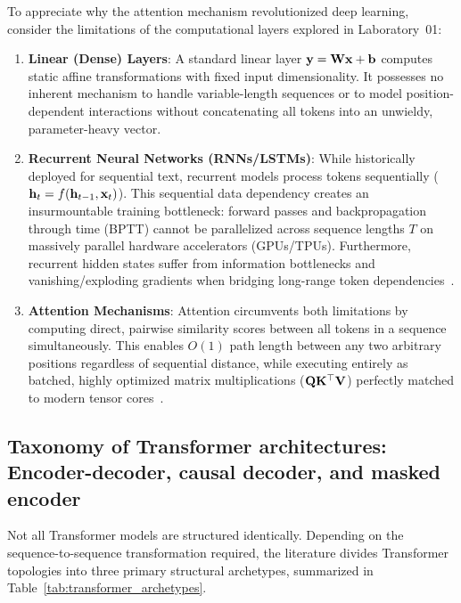 \documentclass[../labs.tex]{subfiles}
\begin{document}
To appreciate why the attention mechanism revolutionized deep learning, consider the limitations of the computational layers explored in Laboratory~01:
\begin{enumerate}
    \item \textbf{Linear (Dense) Layers}: A standard linear layer $\mathbf{y} = \mathbf{W} \mathbf{x} + \mathbf{b}$ computes static affine transformations with fixed input dimensionality. It possesses no inherent mechanism to handle variable-length sequences or to model position-dependent interactions without concatenating all tokens into an unwieldy, parameter-heavy vector.
    \item \textbf{Recurrent Neural Networks (RNNs/LSTMs)}: While historically deployed for sequential text, recurrent models process tokens sequentially ($\mathbf{h}_t = f(\mathbf{h}_{t-1}, \mathbf{x}_t)$). This sequential data dependency creates an insurmountable training bottleneck: forward passes and backpropagation through time (BPTT) cannot be parallelized across sequence lengths $T$ on massively parallel hardware accelerators (GPUs/TPUs). Furthermore, recurrent hidden states suffer from information bottlenecks and vanishing/exploding gradients when bridging long-range token dependencies~\cite{hochreiter1997,pascanu2013difficulty}.
    \item \textbf{Attention Mechanisms}: Attention circumvents both limitations by computing direct, pairwise similarity scores between all tokens in a sequence simultaneously. This enables $O(1)$ path length between any two arbitrary positions regardless of sequential distance, while executing entirely as batched, highly optimized matrix multiplications ($\mathbf{Q} \mathbf{K}^\top \mathbf{V}$) perfectly matched to modern tensor cores~\cite{vaswani2017,dao2022flashattention}.
\end{enumerate}

\subsection{Taxonomy of Transformer architectures: Encoder-decoder, causal decoder, and masked encoder}

Not all Transformer models are structured identically. Depending on the sequence-to-sequence transformation required, the literature divides Transformer topologies into three primary structural archetypes, summarized in Table~\ref{tab:transformer_archetypes}.
\end{document}
